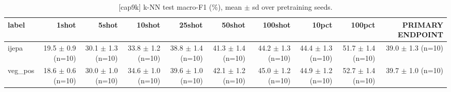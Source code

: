 \begin{table}[t]
\centering
\small
\caption{[cap9k] k-NN test macro-F1 (\%), mean $\pm$ sd over pretraining seeds.}
\label{tab:main_results_knn}
\begin{tabular}{lrrrrrrrrr}
\toprule
label & 1shot & 5shot & 10shot & 25shot & 50shot & 100shot & 10pct & 100pct & PRIMARY ENDPOINT \\
\midrule
ijepa & 19.5 $\pm$ 0.9 (n=10) & 30.1 $\pm$ 1.3 (n=10) & 33.8 $\pm$ 1.2 (n=10) & 38.8 $\pm$ 1.4 (n=10) & 41.3 $\pm$ 1.4 (n=10) & 44.2 $\pm$ 1.3 (n=10) & 44.4 $\pm$ 1.3 (n=10) & 51.7 $\pm$ 1.4 (n=10) & 39.0 $\pm$ 1.3 (n=10) \\
veg\_pos & 18.6 $\pm$ 0.6 (n=10) & 30.0 $\pm$ 1.0 (n=10) & 34.6 $\pm$ 1.0 (n=10) & 39.6 $\pm$ 1.0 (n=10) & 42.1 $\pm$ 1.2 (n=10) & 45.0 $\pm$ 1.2 (n=10) & 44.9 $\pm$ 1.2 (n=10) & 52.7 $\pm$ 1.4 (n=10) & 39.7 $\pm$ 1.0 (n=10) \\
\bottomrule
\end{tabular}
\end{table}

